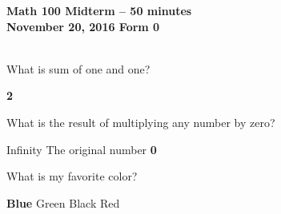 \documentclass[10pt]{exam}
\begin{document}
\setlength\fillinlinelength{0.5in}
\header{}
{\bf{Math 100
 Midterm
 -- 50 minutes
\\November 20, 2016
}}
{\bf{Form 0}\\~}
\vspace{.5cm}
\begin{questions}

\begin{minipage}[c]{\linewidth}
\question What is sum of one and one?
\begin{choices}
\vspace{-0.1in}
\vspace{-0.1in}
\choice \textbf{2}
\vspace{-0.1in}
\end{choices}
\end{minipage}

\begin{minipage}[c]{\linewidth}
\question What is the result of multiplying any number by zero?
\begin{choices}
\vspace{-0.1in}
\choice Infinity
\vspace{-0.1in}
\choice The original number
\vspace{-0.1in}
\choice \textbf{0}
\end{choices}
\end{minipage}

\begin{minipage}[c]{\linewidth}
\question What is my favorite color?
\begin{choices}
\choice \textbf{Blue}
\vspace{-0.1in}
\choice Green
\vspace{-0.1in}
\choice Black
\vspace{-0.1in}
\choice Red\end{choices}
\end{minipage}

\end{questions}
\end{document}
